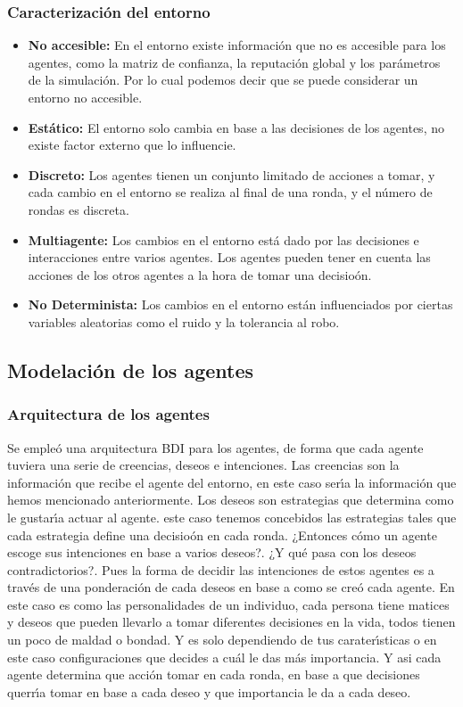 \documentclass{article}
\begin{document}
\subsubsection{Caracterizaci\'on del entorno}
\begin{itemize}
      \item \textbf{No accesible:} En el entorno existe informaci\'on que no es accesible para los agentes, como la matriz de confianza, la reputaci\'on global y los par\'ametros
            de la simulaci\'on. Por lo cual podemos decir que se puede considerar un entorno no accesible.
      \item \textbf{Est\'atico:} El entorno solo cambia en base a las decisiones de los agentes, no existe factor externo que lo influencie.
      \item \textbf{Discreto:} Los agentes tienen un conjunto limitado de acciones a tomar, y cada cambio en el entorno se realiza al final de una ronda, y el n\'umero de rondas es discreta.
      \item \textbf{Multiagente:} Los cambios en el entorno est\'a dado por las decisiones e interacciones entre varios agentes. Los agentes pueden tener en cuenta las acciones de los
            otros agentes a la hora de tomar una decisio\'on.
      \item \textbf{No Determinista:} Los cambios en el entorno est\'an influenciados por ciertas variables aleatorias como el ruido y la tolerancia al robo.
\end{itemize}


\subsection{Modelaci\'on de los agentes}

\subsubsection{Arquitectura de los agentes}
Se emple\'o una arquitectura BDI para los agentes, de forma que cada agente tuviera una serie de creencias, deseos e intenciones. Las creencias son la informaci\'on que recibe 
el agente del entorno, en este caso ser\'{\i}a la informaci\'on que hemos mencionado anteriormente. Los deseos son estrategias que determina como le gustar\'{\i}a actuar al agente.
este caso tenemos concebidos las estrategias tales que cada estrategia define una decisio\'on en cada ronda. ¿Entonces c\'omo un agente escoge sus intenciones en base a varios deseos?. 
¿Y qu\'e pasa con los deseos contradictorios?. Pues la forma de decidir las intenciones de estos agentes es a trav\'es de una ponderaci\'on de cada deseos en base a como se cre\'o cada agente. 
En este caso es como las personalidades de un individuo, cada persona tiene matices y deseos que pueden llevarlo a tomar diferentes decisiones en la vida, todos tienen un poco de maldad o bondad. 
Y es solo dependiendo de tus carater\'{\i}sticas o en este caso configuraciones que decides a cu\'al le das m\'as importancia. Y asi cada agente determina que acci\'on tomar en cada ronda, en base 
a que decisiones querr\'{\i}a tomar en base a cada deseo y que importancia le da a cada deseo. 
 
\end{document}
